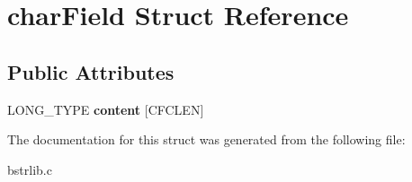 \hypertarget{structcharField}{}\section{char\+Field Struct Reference}
\label{structcharField}
\subsection*{Public Attributes}
\begin{DoxyCompactItemize}
\item 
\hypertarget{structcharField_a8f9248fefe062f32178d961d330454a1}{}L\+O\+N\+G\+\_\+\+T\+Y\+P\+E {\bfseries content} \mbox{[}C\+F\+C\+L\+E\+N\mbox{]}\label{structcharField_a8f9248fefe062f32178d961d330454a1}

\end{DoxyCompactItemize}


The documentation for this struct was generated from the following file\+:\begin{DoxyCompactItemize}
\item 
bstrlib.\+c\end{DoxyCompactItemize}
